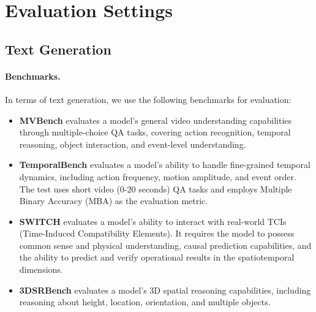 \documentclass{llmxive}
\providecommand{\currentnavsection}{sec:intro}
\providecommand{\setnavsection}[1]{  \gdef\currentnavsection{#1}}
\providecommand{\thefigure}{A\arabic{figure}}
\providecommand{\theHfigure}{A\arabic{figure}}
\providecommand{\thetable}{A\arabic{table}}
\providecommand{\theHtable}{A\arabic{table}}
\providecommand{\thelstlisting}{E\arabic{lstlisting}}
\providecommand{\theHlstlisting}{E\arabic{lstlisting}}
\begin{document}
\section{Evaluation Settings}\label{sec:appendix_evaluation}
\setnavsection{sec:appendix_evaluation}

\renewcommand{\thefigure}{E\arabic{figure}}
\renewcommand{\theHfigure}{E\arabic{figure}}
\setcounter{figure}{0}

\renewcommand{\thetable}{E\arabic{table}}
\renewcommand{\theHtable}{E\arabic{table}}
\setcounter{table}{0}

\renewcommand{\thelstlisting}{E\arabic{lstlisting}}
\renewcommand{\theHlstlisting}{E\arabic{lstlisting}}
\setcounter{lstlisting}{0}

\subsection{Text Generation}\label{sec:appendix_evaluation_toL}

\paragraph{Benchmarks.} In terms of text generation, we use the following benchmarks for evaluation:

\begin{itemize}
    \item \textbf{MVBench} \citep{MVBench} evaluates a model's general video understanding capabilities through multiple-choice QA tasks, covering action recognition, temporal reasoning, object interaction, and event-level understanding.
    \item \textbf{TemporalBench} \citep{cai2024temporalbench} evaluates a model's ability to handle fine-grained temporal dynamics, including action frequency, motion amplitude, and event order. The test uses short video (0-20 seconds) QA tasks and employs Multiple Binary Accuracy (MBA) as the evaluation metric.
    \item \textbf{SWITCH} \citep{switch2025} evaluates a model's ability to interact with real-world TCIs (Time-Induced Compatibility Elements). It requires the model to possess common sense and physical understanding, causal prediction capabilities, and the ability to predict and verify operational results in the spatiotemporal dimensions.
    \item \textbf{3DSRBench} \citep{ma20253dsrbench} evaluates a model's 3D spatial reasoning capabilities, including reasoning about height, location, orientation, and multiple objects.
\end{itemize}
\end{document}
